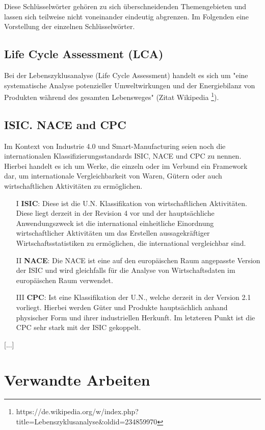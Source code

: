 \documentclass{article}
\begin{document}
Diese Schlüsselwörter gehören zu sich überschneidenden Themengebieten und lassen sich teilweise nicht voneinander eindeutig abgrenzen.
Im Folgenden eine Vorstellung der einzelnen Schlüsselwörter.

\subsection{Life Cycle Assessment (LCA)}

Bei der Lebenszyklusanalyse (Life Cycle Assessment) handelt es sich um "eine systematische Analyse potenzieller Umweltwirkungen und der Energiebilanz von Produkten während des gesamten Lebensweges" (Zitat Wikipedia \footnote{https://de.wikipedia.org/w/index.php?title=Lebenszyklusanalyse\&oldid=234859970}).

\subsection{ISIC. NACE and CPC}
Im Kontext von Industrie 4.0 und Smart-Manufacturing seien noch die internationalen Klassifizierungsstandards ISIC, NACE und CPC zu nennen. Hierbei handelt es ich um Werke, die einzeln oder im Verbund ein Framework dar, um internationale Vergleichbarkeit von Waren, Gütern oder auch wirtschaftlichen Aktivitäten zu ermöglichen.


\begin{itemize}
	\item[I] \textbf{ISIC}: Diese ist die U.N. Klassifikation von wirtschaftlichen Aktivitäten. Diese liegt derzeit in der Revision 4 vor und der hauptsächliche Anwendungszweck ist die international einheitliche Einordnung wirtschaftlicher Aktivitäten um das Erstellen aussagekräftiger Wirtschaftsstatistiken zu ermöglichen, die international vergleichbar sind.\cite{UNSDISIC}
	\item[II] \textbf{NACE}: Die NACE ist eine auf den europäischen Raum angepasste Version der ISIC und wird gleichfalls für die Analyse von Wirtschaftsdaten im europäischen Raum verwendet.\cite{EurostatNACE}
	\item[III] \textbf{CPC}: Ist eine Klassifikation der U.N., welche derzeit in der Version 2.1 vorliegt. Hierbei werden Güter und Produkte hauptsächlich anhand physischer Form und ihrer industriellen Herkunft. Im letzteren Punkt ist die CPC sehr stark mit der ISIC gekoppelt.\cite{UNSDCPCv21}
\end{itemize}


[...]

\section{Verwandte Arbeiten}
\end{document}
